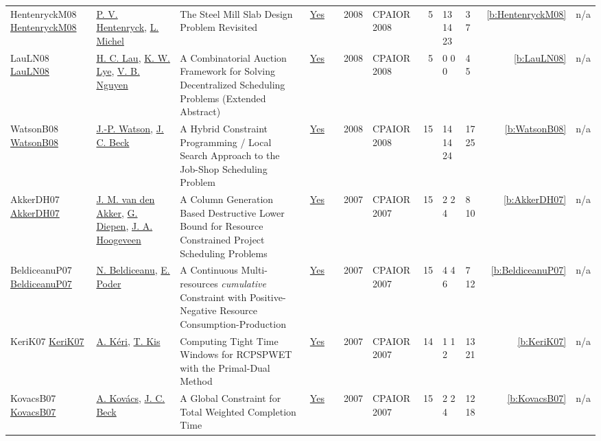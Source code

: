 {\begin{longtable}{>{\raggedright\arraybackslash}p{3cm}>{\raggedright\arraybackslash}p{4.5cm}>{\raggedright\arraybackslash}p{6.0cm}rrrp{2.5cm}rp{1cm}p{1cm}rr}
HentenryckM08 \href{https://doi.org/10.1007/978-3-540-68155-7_41}{HentenryckM08} & \hyperref[auth:a148]{P. V. Hentenryck}, \hyperref[auth:a32]{L. Michel} & The Steel Mill Slab Design Problem Revisited & \href{../works/HentenryckM08.pdf}{Yes} & \cite{HentenryckM08} & 2008 & CPAIOR 2008 & 5 & 13 14 23 & 3 7 & \ref{b:HentenryckM08} & n/a\\
LauLN08 \href{https://doi.org/10.1007/978-3-540-68155-7_33}{LauLN08} & \hyperref[auth:a364]{H. C. Lau}, \hyperref[auth:a365]{K. W. Lye}, \hyperref[auth:a366]{V. B. Nguyen} & A Combinatorial Auction Framework for Solving Decentralized Scheduling Problems (Extended Abstract) & \href{../works/LauLN08.pdf}{Yes} & \cite{LauLN08} & 2008 & CPAIOR 2008 & 5 & 0 0 0 & 4 5 & \ref{b:LauLN08} & n/a\\
WatsonB08 \href{https://doi.org/10.1007/978-3-540-68155-7_21}{WatsonB08} & \hyperref[auth:a360]{J.-P. Watson}, \hyperref[auth:a89]{J. C. Beck} & \cellcolor{green!10}A Hybrid Constraint Programming / Local Search Approach to the Job-Shop Scheduling Problem & \href{../works/WatsonB08.pdf}{Yes} & \cite{WatsonB08} & 2008 & CPAIOR 2008 & 15 & 14 14 24 & 17 25 & \ref{b:WatsonB08} & n/a\\
AkkerDH07 \href{https://doi.org/10.1007/978-3-540-72397-4_27}{AkkerDH07} & \hyperref[auth:a372]{J. M. van den Akker}, \hyperref[auth:a373]{G. Diepen}, \hyperref[auth:a374]{J. A. Hoogeveen} & \cellcolor{green!10}A Column Generation Based Destructive Lower Bound for Resource Constrained Project Scheduling Problems & \href{../works/AkkerDH07.pdf}{Yes} & \cite{AkkerDH07} & 2007 & CPAIOR 2007 & 15 & 2 2 4 & 8 10 & \ref{b:AkkerDH07} & n/a\\
BeldiceanuP07 \href{https://doi.org/10.1007/978-3-540-72397-4_16}{BeldiceanuP07} & \hyperref[auth:a128]{N. Beldiceanu}, \hyperref[auth:a358]{E. Poder} & A Continuous Multi-resources \emph{cumulative} Constraint with Positive-Negative Resource Consumption-Production & \href{../works/BeldiceanuP07.pdf}{Yes} & \cite{BeldiceanuP07} & 2007 & CPAIOR 2007 & 15 & 4 4 6 & 7 12 & \ref{b:BeldiceanuP07} & n/a\\
KeriK07 \href{https://doi.org/10.1007/978-3-540-72397-4_10}{KeriK07} & \hyperref[auth:a367]{A. K{\'{e}}ri}, \hyperref[auth:a155]{T. Kis} & Computing Tight Time Windows for {RCPSPWET} with the Primal-Dual Method & \href{../works/KeriK07.pdf}{Yes} & \cite{KeriK07} & 2007 & CPAIOR 2007 & 14 & 1 1 2 & 13 21 & \ref{b:KeriK07} & n/a\\
KovacsB07 \href{https://doi.org/10.1007/978-3-540-72397-4_9}{KovacsB07} & \hyperref[auth:a146]{A. Kov{\'{a}}cs}, \hyperref[auth:a89]{J. C. Beck} & \cellcolor{green!10}A Global Constraint for Total Weighted Completion Time & \href{../works/KovacsB07.pdf}{Yes} & \cite{KovacsB07} & 2007 & CPAIOR 2007 & 15 & 2 2 4 & 12 18 & \ref{b:KovacsB07} & n/a\\

\end{longtable}}
